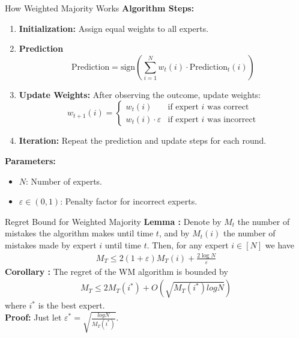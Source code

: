 \documentclass{beamer}
\begin{document}
\begin{frame}{How Weighted Majority Works}
    \textbf{Algorithm Steps:}
    \begin{enumerate}
        \item \textbf{Initialization:} Assign equal weights to all experts.
        \item \textbf{Prediction}
        \[
            \text{Prediction} = \text{sign}\left(\sum_{i=1}^{N} w_t(i) \cdot \text{Prediction}_t(i)\right)
        \]
        \item \textbf{Update Weights:} After observing the outcome, update weights:
        \[
            w_{t+1}(i) = 
            \begin{cases}
                w_t(i) & \text{if expert } i \text{ was correct} \\
                w_t(i) \cdot \varepsilon & \text{if expert } i \text{ was incorrect}
            \end{cases}
        \]
        \item \textbf{Iteration:} Repeat the prediction and update steps for each round.
    \end{enumerate}
    \textbf{Parameters:}
    \begin{itemize}
        \item $N$: Number of experts.
        \item $\varepsilon \in (0,1)$: Penalty factor for incorrect experts.
    \end{itemize}
\end{frame}

\begin{frame}{Regret Bound for Weighted Majority}
    \textbf{Lemma :} Denote by $M_t$ the number of mistakes the algorithm makes until time $t$, and by $M_t(i)$ the number of mistakes made by expert $i$ until time $t$. Then, for any expert $i \in [N]$ we have
        \begin{align*}
        M_T \leq 2(1+\varepsilon)M_T(i) + \frac{2\log N}{\varepsilon}
    \end{align*}
    \vspace{0.5 em}
    \textbf{Corollary :} The regret of the WM algorithm is bounded by
    \begin{align*}
        M_T \leq 2M_T(i^*) + O(\sqrt{M_T(i^*) log N})
    \end{align*} 
    where $i^*$ is the best expert.\\
    \vspace{0.5 em}
    \textbf{Proof:} Just let $\varepsilon^* = \sqrt{\frac{log N}{M_T(i^*)}}$.
\end{frame}
\end{document}
